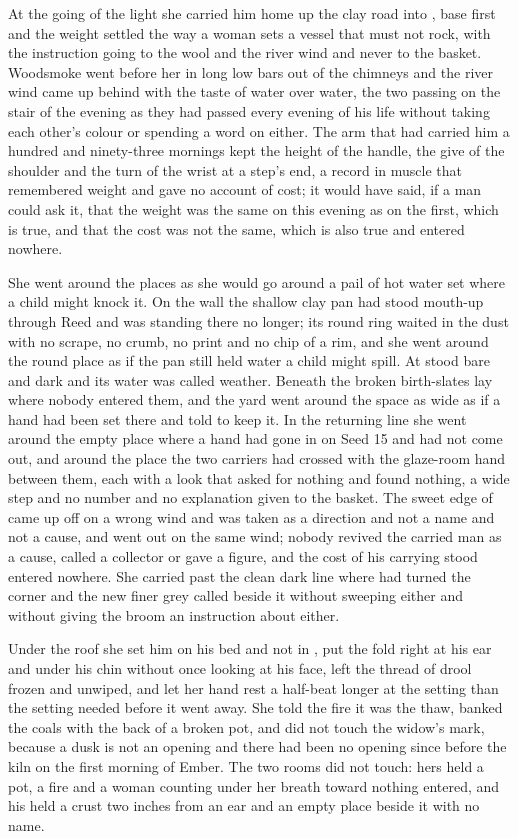 At the going of the light she carried him home up the clay road into , base first and the weight settled the way a woman sets a vessel that must not rock, with the instruction going to the wool and the river wind and never to the basket. Woodsmoke went before her in long low bars out of the chimneys and the river wind came up behind with the taste of water over water, the two passing on the stair of the evening as they had passed every evening of his life without taking each other's colour or spending a word on either. The arm that had carried him a hundred and ninety-three mornings kept the height of the handle, the give of the shoulder and the turn of the wrist at a step's end, a record in muscle that remembered weight and gave no account of cost; it would have said, if a man could ask it, that the weight was the same on this evening as on the first, which is true, and that the cost was not the same, which is also true and entered nowhere.

She went around the places as she would go around a pail of hot water set where a child might knock it. On the wall the shallow clay pan had stood mouth-up through Reed and was standing there no longer; its round ring waited in the dust with no scrape, no crumb, no print and no chip of a rim, and she went around the round place as if the pan still held water a child might spill. At   stood bare and dark and its water was called weather. Beneath  the broken birth-slates lay where nobody entered them, and the yard went around the space as wide as if a hand had been set there and told to keep it. In the returning line she went around the empty place where a hand had gone in on Seed 15 and had not come out, and around the place the two carriers had crossed with the glaze-room hand between them, each with a look that asked for nothing and found nothing, a wide step and no number and no explanation given to the basket. The sweet edge of  came up off  on a wrong wind and was taken as a direction and not a name and not a cause, and went out on the same wind; nobody revived the carried man as a cause, called a collector or gave a figure, and the cost of his carrying stood entered nowhere. She carried past the clean dark line where  had turned the corner and the new finer grey called  beside it without sweeping either and without giving the broom an instruction about either.

Under the roof she set him on his bed and not in , put the fold right at his ear and under his chin without once looking at his face, left the thread of drool frozen and unwiped, and let her hand rest a half-beat longer at the setting than the setting needed before it went away. She told the fire it was the thaw, banked the coals with the back of a broken pot, and did not touch the widow's mark, because a dusk is not an opening and there had been no opening since before the kiln on the first morning of Ember. The two rooms did not touch: hers held a pot, a fire and a woman counting under her breath toward nothing entered, and his held a crust two inches from an ear and an empty place beside it with no name.

